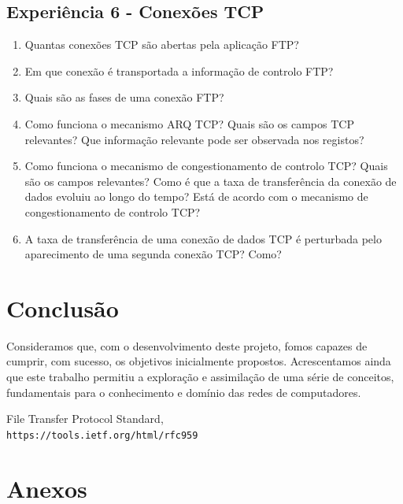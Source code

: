\documentclass{article}
\begin{document}
\subsection{Experiência 6 - Conexões TCP}
\begin{enumerate}
\item Quantas conexões TCP são abertas pela aplicação FTP?

\item Em que conexão é transportada a informação de controlo FTP?

\item Quais são as fases de uma conexão FTP?

\item Como funciona o mecanismo ARQ TCP? Quais são os campos TCP relevantes? Que informação relevante pode ser observada nos
registos?

\item Como funciona o mecanismo de congestionamento de controlo TCP? Quais são os campos relevantes? Como é que
a taxa de transferência da conexão de dados evoluiu ao longo do tempo? Está de acordo com o mecanismo de congestionamento de controlo TCP?

\item A taxa de transferência de uma conexão de dados TCP é perturbada pelo aparecimento de uma segunda conexão TCP? Como?
\end{enumerate}
\section{Conclusão}
Consideramos que, com o desenvolvimento deste projeto, fomos capazes de cumprir, com sucesso, os objetivos inicialmente propostos.  Acrescentamos ainda que este trabalho permitiu a exploração e assimilação de uma série de conceitos, fundamentais para o conhecimento e domínio das redes de computadores.  

\begin{thebibliography}{1}
    File Transfer Protocol Standard,
    \\\texttt{https://tools.ietf.org/html/rfc959}
\end{thebibliography}
\section{Anexos}
\end{document}
